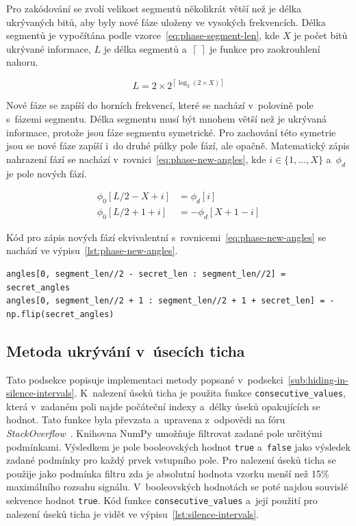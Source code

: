 Pro zakódování se zvolí velikost segmentů několikrát větší než je délka
ukrývaných bitů, aby byly nové fáze uloženy ve vysokých frekvencích. Délka
segmentů je vypočítána podle vzorce~\ref{eq:phase-segment-len}, kde $X$ je
počet bitů ukrývané informace, $L$ je délka segmentů
a~$\left\lceil~\right\rceil$ je funkce pro zaokrouhlení nahoru.

\begin{equation}
    \label{eq:phase-segment-len}
    L = 2 \times 2^{\left\lceil \log_2{(2 \times X)} \right\rceil}
\end{equation}

Nové fáze se zapíší do horních frekvencí, které se nachází v~polovině pole
s~fázemi segmentu. Délka segmentu musí být mnohem větší než je ukrývaná
informace, protože jsou fáze segmentu symetrické. Pro zachování této symetrie
jsou se nové fáze zapíší i~do druhé půlky pole fází, ale opačně. Matematický
zápis nahrazení fází se nachází v~rovnici~\ref{eq:phase-new-angles}, kde $i \in
\{ 1, \dots, X \}$ a~$\phi_d$ je pole nových fází.

\begin{equation}
    \begin{aligned}
        \label{eq:phase-new-angles}
        \phi_0[L/2 - X + i] &= \phi_d[i] \\
        \phi_0[L/2 + 1 + i] &= -\phi_d[X + 1 - i]
    \end{aligned}
\end{equation}

Kód pro zápis nových fází ekvivalentní s~rovnicemi~\ref{eq:phase-new-angles} se
nachází ve výpisu~\ref{lst:phase-new-angles}.

\begin{lstlisting}[language=PythonPlus, label={lst:phase-new-angles},
caption={Zápis nových fází do pole s~fázemi segmentu.}]
angles[0, segment_len//2 - secret_len : segment_len//2] = secret_angles
angles[0, segment_len//2 + 1 : segment_len//2 + 1 + secret_len] = -np.flip(secret_angles)
\end{lstlisting}

\subsection*{Metoda ukrývání v~úsecích ticha}
\label{sub:hiding-in-silence-intervals-implementation}

Tato podsekce popisuje implementaci metody popsané
v~podsekci~\ref{sub:hiding-in-silence-intervals}. K~nalezení úseků ticha je
použita funkce \texttt{consecutive\_values}, která v~zadaném poli najde
počáteční indexy a~délky úseků opakujících se hodnot. Tato funkce byla převzata
a~upravena z~odpovědi na fóru
\textit{StackOverflow}~\cite{ConsecutiveValuesStackOverflow}. Knihovna NumPy
umožňuje filtrovat zadané pole určitými podmínkami. Výsledkem je pole
booleovských hodnot \texttt{true} a~\texttt{false} jako výsledek zadané
podmínky pro každý prvek vstupního pole. Pro nalezení úseků ticha se použije
jako podmínka filtru zda je absolutní hodnota vzorku menší než 15\% maximálního
rozsahu signálu. V~booleovských hodnotách se poté najdou souvislé sekvence
hodnot \texttt{true}. Kód funkce \texttt{consecutive\_values} a~její použití
pro nalezení úseků ticha je vidět ve výpisu~\ref{lst:silence-intervals}.

